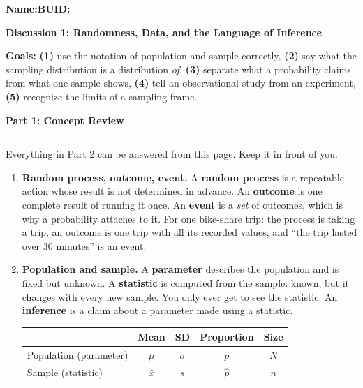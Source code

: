 \documentclass[11pt]{article}
\newcommand{\blankline}[1]{\underline{\hspace{#1}}}
\newcommand{\parttitle}[1]{%
  \par\medskip\noindent
  {\large\bfseries #1}\par
  \vspace{-.5em}\noindent\rule{\linewidth}{0.4pt}\par\smallskip}
\begin{document}
\noindent\textbf{Name:}\blankline{2.3in}\hfill\textbf{BUID:}\blankline{1.6in}

\begin{center}
  {\Large\bfseries Discussion 1: Randomness, Data, and the Language of Inference}
\end{center}

\noindent\textbf{Goals:} \textbf{(1)} use the notation of population and sample correctly,
\textbf{(2)} say what the sampling distribution is a distribution \emph{of}, \textbf{(3)}
separate what a probability claims from what one sample shows, \textbf{(4)} tell an
observational study from an experiment, \textbf{(5)} recognize the limits of a sampling frame.

\parttitle{Part 1: Concept Review}

{\small

\noindent Everything in Part 2 can be answered from this page. Keep it in front of you.

\begin{enumerate}[label=\textbf{\arabic*.}, wide=0pt, itemsep=.55em, topsep=.5em]

\item \textbf{Random process, outcome, event.} A \textbf{random process} is a repeatable action
whose result is not determined in advance. An \textbf{outcome} is one complete result of running
it once. An \textbf{event} is a \emph{set} of outcomes, which is why a probability attaches to it.
For one bike-share trip: the process is taking a trip, an outcome is one trip with all its
recorded values, and ``the trip lasted over 30 minutes'' is an event.

\item \textbf{Population and sample.} A \textbf{parameter} describes the population and is fixed
but unknown. A \textbf{statistic} is computed from the sample: known, but it changes with every
new sample. You only ever get to see the statistic. An \textbf{inference} is a claim about a
parameter made using a statistic.

\begin{center}
\renewcommand{\arraystretch}{1.1}
\begin{tabular}{lcccc}
\toprule
 & Mean & SD & Proportion & Size \\
\midrule
Population (parameter) & $\mu$ & $\sigma$ & $p$ & $N$ \\
Sample (statistic) & $\bar{x}$ & $s$ & $\hat{p}$ & $n$ \\
\bottomrule
\end{tabular}
\end{center}


\end{enumerate}}
\end{document}
